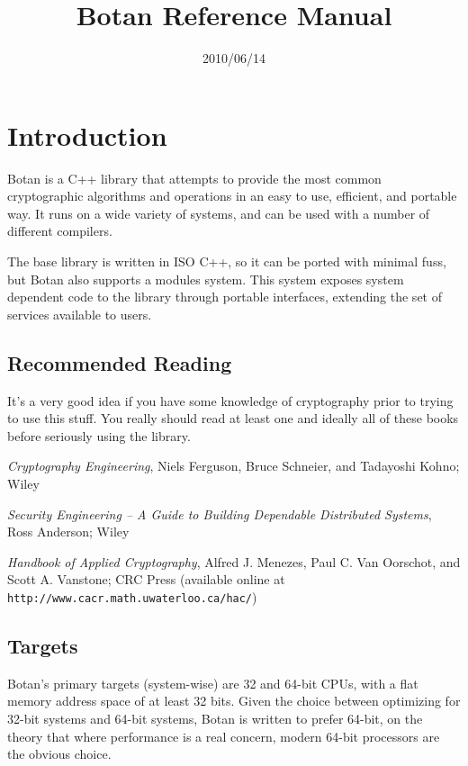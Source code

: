\documentclass{article}
\title{\textbf{Botan Reference Manual}}
\author{}
\date{2010/06/14}
\newcommand{\url}[1]{\texttt{#1}}
\begin{document}
\maketitle

\tableofcontents

\parskip=5pt

\pagebreak

\section{Introduction}

Botan is a C++ library that attempts to provide the most common
cryptographic algorithms and operations in an easy to use, efficient,
and portable way. It runs on a wide variety of systems, and can be
used with a number of different compilers.

The base library is written in ISO C++, so it can be ported with
minimal fuss, but Botan also supports a modules system. This system
exposes system dependent code to the library through portable
interfaces, extending the set of services available to users.

\subsection{Recommended Reading}

It's a very good idea if you have some knowledge of cryptography prior
to trying to use this stuff. You really should read at least one and
ideally all of these books before seriously using the library.

\setlength{\parskip}{5pt}

\noindent
\textit{Cryptography Engineering}, Niels Ferguson, Bruce Schneier, and
Tadayoshi Kohno; Wiley

\noindent
\textit{Security Engineering -- A Guide to Building Dependable
  Distributed Systems}, Ross Anderson; Wiley

\noindent
\textit{Handbook of Applied Cryptography}, Alfred J. Menezes,
Paul C. Van Oorschot, and Scott A. Vanstone; CRC Press (available
online at \url{http://www.cacr.math.uwaterloo.ca/hac/})

\subsection{Targets}

Botan's primary targets (system-wise) are 32 and 64-bit CPUs, with a
flat memory address space of at least 32 bits. Given the choice
between optimizing for 32-bit systems and 64-bit systems, Botan is
written to prefer 64-bit, on the theory that where performance is a
real concern, modern 64-bit processors are the obvious choice.
\end{document}
